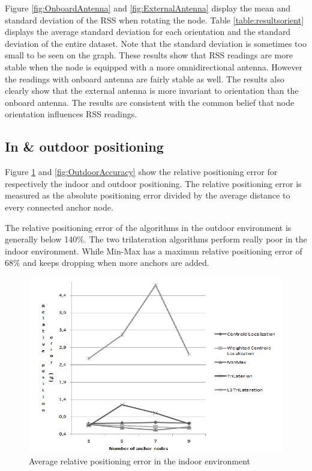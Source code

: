 Figure \ref{fig:OnboardAntenna} and \ref{fig:ExternalAntenna} display the mean and standard deviation of the RSS when rotating the node. Table \ref{table:resultsorient} displays the average standard deviation for each orientation and the standard deviation of the entire dataset. Note that the standard deviation is sometimes too small to be seen on the graph. These results show that RSS readings are more stable when the node is equipped with a more omnidirectional antenna. However the readings with onboard antenna are fairly stable as well. The results also clearly show that the external antenna is more invariant to orientation than the onboard antenna. 
The results are consistent with the common belief that node orientation influences RSS readings.

\subsection{In \& outdoor positioning}
Figure \ref{fig:IndoorAccuracy} and \ref{fig:OutdoorAccuracy} show the relative positioning error for respectively the indoor and outdoor positioning. The relative positioning error is measured as the absolute positioning error divided by the average distance to every connected anchor node.


The relative positioning error of the algorithms in the outdoor environment is generally below 140\%. The two trilateration algorithms perform really poor in the indoor environment. While Min-Max has a maximun relative positioning error of 68\% and keeps dropping when more anchors are added.
\begin{figure}[h]
	\centering
		\includegraphics[scale=0.5]{Images/IndoorAccuracy.png}
	\caption{Average relative positioning error in the indoor environment}
	\label{fig:IndoorAccuracy}
\end{figure}

